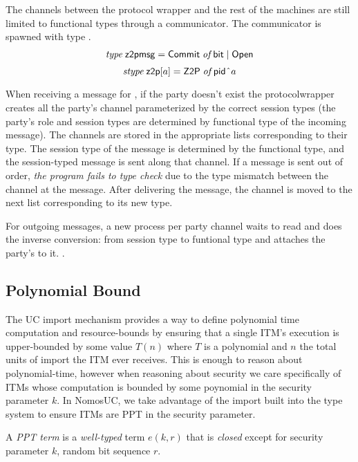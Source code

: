 The channels between the protocol wrapper and the rest of the machines are still limited to functional types through a communicator. The communicator is spawned with type .
\begin{gather}
\mbox{\it type} \; \mathsf{z2pmsg} = \mathsf{Commit} \; \mbox{\it of} \; \mathsf{bit} \; | \; \mathsf{Open}
\end{gather}
\[
	\mbox{\it stype} \; \mathsf{z2p}[a] = \mathsf{Z2P} \; \mbox{\it of} \; {\mathsf {pid}} \; \hat{ } \; a
\]

When receiving a message for , if the party doesn't exist the protocolwrapper creates all the party's channel parameterized by the correct session types (the party's role and session types are determined by functional type of the incoming message).
The channels are stored in the appropriate lists corresponding to their type.
The session type of the message is determined by the functional type, and the session-typed message is sent along that channel.
If a message is sent out of order, \textit{the program fails to type check} due to the type mismatch between the channel at the message.
After delivering the message, the channel is moved to the next list corresponding to its new type.

For outgoing messages, a new process per party channel waits to read and does the inverse conversion: from session type to funtional type and attaches the party's  to it.
.


\subsection{Polynomial Bound}
The UC import mechanism provides a way to define polynomial time computation and resource-bounds by ensuring that a single ITM's execution is upper-bounded by some value $T(n)$ where $T$ is a polynomial and $n$ the total units of import the ITM ever receives.
This is enough to reason about polynomial-time, however when reasoning about security we care specifically of ITMs whose computation is bounded by some poynomial in the security parameter $k$. 
In NomosUC, we take advantage of the import built into the type system to ensure ITMs are PPT in the security parameter. 

\begin{definition}\label{def:pptterm}
A \textit{PPT term} is a \textit{well-typed} term $e(k, r)$ that is \textit{closed} except for security parameter $k$, random bit sequence $r$.
\end{definition}

